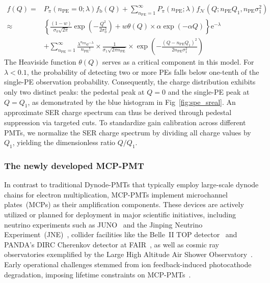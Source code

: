 \begin{equation}
	\begin{aligned}
		f(Q) =  & P_{\pi}(n_{\mathrm{PE}}=0;\lambda)f_{\mathrm{b}}(Q) + \sum_{n_{\mathrm{PE}}=1}^{\infty}P_{\pi}(n_{\mathrm{PE}};\lambda) f_{\mathcal{N}}(Q; n_{\mathrm{PE}}Q_1,n_{\mathrm{PE}}\sigma_1^2) \\
		\approx & \left\{\frac{(1-w)}{\sigma_0 \sqrt{2 \pi}} \exp \left(-\frac{Q^2}{2 \sigma_0^2}\right)
		+w \theta(Q)\times \alpha \exp \left(-\alpha Q\right)\right\} \mathrm{e}^{-\lambda}                                                                                                                \\
		        & +\sum_{n_{\mathrm{PE}}=1}^{\infty} \frac{\lambda^{n_{\mathrm{PE}}} \mathrm{e}^{-\lambda}}{n_{\mathrm{PE}} !}
		\times \frac{1}{\sigma_1 \sqrt{2 \pi n_{\mathrm{PE}}}}\times
		\exp \left(-\frac{\left(Q-n_{\mathrm{PE}} Q_1\right)^2}{2 n_{\mathrm{PE}} \sigma_1^2}\right)
	\end{aligned}
	\label{eq:sreal}
\end{equation}
The Heaviside function $\theta(Q)$ serves as a critical component in this model. For $\lambda < 0.1$, the probability of detecting two or more PEs falls below one-tenth of the single-PE observation probability. Consequently, the charge distribution exhibits only two distinct peaks: the pedestal peak at $Q=0$ and the single-PE peak at $Q=Q_1$, as demonstrated by the blue histogram in Fig~\ref{fig:spe_sreal}.
An approximate SER charge spectrum can thus be derived through pedestal suppression via targeted cuts. To standardize gain calibration across different PMTs, we normalize the SER charge spectrum by dividing all charge values by $Q_1$, yielding the dimensionless ratio $Q/Q_1$.

\subsubsection{The newly developed MCP-PMT}
In contrast to traditional Dynode-PMTs that typically employ large-scale dynode chains for electron multiplication, MCP-PMTs implement microchannel plates~(MCPs) as their amplification components. These devices are actively utilized or planned for deployment in major scientific initiatives, including neutrino experiments such as JUNO~\cite{ZHU2020162002} and the Jinping Neutrino Experiment~(JNE)~\cite{Zhang:2023ued}, collider facilities like the Belle~II TOP detector~\cite{MATSUOKA2014148} and PANDA's DIRC Cherenkov detector at FAIR~\cite{KRAUSS2023168659}, as well as cosmic ray observatories exemplified by the Large High Altitude Air Shower Observatory~\cite{Cao2019UpgradingPT}. Early operational challenges stemmed from ion feedback-induced photocathode degradation, imposing lifetime constraints on MCP-PMTs~\cite{N2006Lifetime}.

